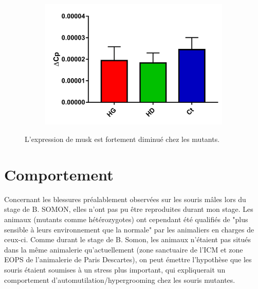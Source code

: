 \begin{figure}[h]
\begin{center}
\begin{subfigure}[h]{0.329\textwidth}
				\includegraphics[width=\textwidth]{./Images/qPCR/Comp_Struct_Mut.jpg}
			\end{subfigure}
		\end{center}
		\caption{L'expression de \gls{musk} est fortement diminué chez les mutants.}
		\label{fig:ExpressionMuSK}
	\end{figure}
\FloatBarrier

\section{Comportement}
\label{sec:Comportement}
Concernant les blessures préalablement observées sur les souris \mcrd mâles lors du stage de B. SOMON, elles n'ont pas pu être reproduites durant mon stage. Les animaux (mutants comme hétérozygotes) ont cependant été qualifiés de "plus sensible à leurs environnement que la normale" par les animaliers en charges de ceux-ci. Comme durant le stage de B. Somon, les animaux n'étaient pas situés dans la même animalerie qu'actuellement (zone sanctuaire de l'ICM et zone EOPS de l'animalerie de Paris Descartes), on peut émettre l'hypothèse que les souris étaient soumises à un stress plus important, qui expliquerait un comportement d'automutilation/hypergrooming chez les souris mutantes. 
